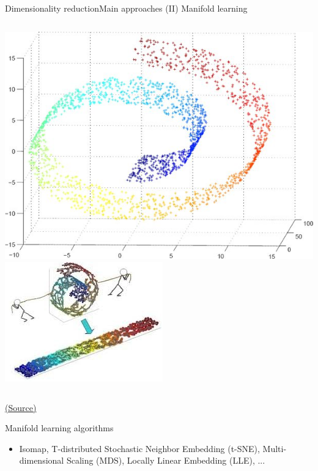 \documentclass[10pt,compress]{beamer} %
\begin{document}
\begin{frame}{Dimensionality reduction}{Main approaches (II)}
    \centering Manifold learning
    \begin{columns}
	    \includegraphics[width=\textwidth]{figs/manifold2.jpeg} 
	    \includegraphics[width=\textwidth]{figs/manifold.jpeg} 
    \end{columns}
	\scriptsize\href{https://www.quora.com/What-is-manifold-learning}{(Source)}
    \normalsize
    \flushleft

    Manifold learning algorithms
    \begin{itemize}
		\item Isomap, T-distributed Stochastic Neighbor Embedding (t-SNE), Multi-dimensional Scaling (MDS), Locally Linear Embedding (LLE), ...
    \end{itemize}
\end{frame}
\end{document}
